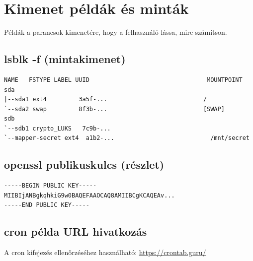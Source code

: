 \section{Kimenet példák és minták}

Példák a parancsok kimenetére, hogy a felhasználó lássa, mire számítson.

\subsection{lsblk -f (mintakimenet)}
\begin{verbatim}
NAME   FSTYPE LABEL UUID                                 MOUNTPOINT
sda                                                         
|--sda1 ext4         3a5f-...                           /
`--sda2 swap         8f3b-...                           [SWAP]
sdb                                                         
`--sdb1 crypto_LUKS   7c9b-...                          
`--mapper-secret ext4  a1b2-...                           /mnt/secret
\end{verbatim}

\subsection{openssl publikuskulcs (részlet)}
\begin{verbatim}
-----BEGIN PUBLIC KEY-----
MIIBIjANBgkqhkiG9w0BAQEFAAOCAQ8AMIIBCgKCAQEAv...
-----END PUBLIC KEY-----
\end{verbatim}

\subsection{cron példa URL hivatkozás}
A cron kifejezés ellenőrzéséhez használható: \url{https://crontab.guru/}
